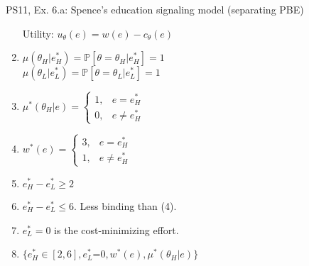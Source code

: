 \begin{frame}{PS11, Ex. 6.a: Spence’s education signaling model (separating PBE)}
\begin{multicols}{2}
\begin{enumerate}
        \item[Utility:] \vspace{-4pt}$u_\theta(e)=w(e)-c_\theta(e)$
        \item $\mu\left(\theta_H|e_H^*\right)=
               \mathbb{P}\left[\theta=\theta_H|e_H^*\right]=1$\\
              $\mu\left(\theta_L|e_L^*\right)=
               \mathbb{P}\left[\theta=\theta_L|e_L^*\right]=1$
        \item $\mu^*(\theta_H|e)=\left\{\begin{array}{ll}
                  1, & e = e_H^* \\
                  0, & e \neq e_H^*
               \end{array}\right.$
        \item $w^*(e)=\left\{\begin{array}{ll}
                  3, & e = e_H^* \\
                  1, & e \neq e_H^*
               \end{array}\right.$
        \item $e_H^*-e_L^*\geq2$
        \item $e_H^*-e_L^*\leq6$. Less binding than (4).
        \item $e_L^*=0$ is the cost-minimizing effort.
        \item $\{e_H^*\in[2,6],e_L^*$=$0,w^*(e),\mu^*(\theta_H|e)\}$
      \end{enumerate}
    \end{multicols}
    \vfill\null
\end{frame}

